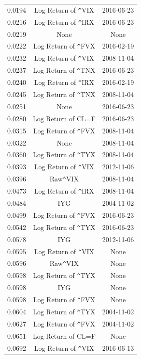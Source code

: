 \documentclass{uiucthesis2021}
\theoremstyle{definition}
\begin{document}
\begin{table}[ht]
\begin{tabular}{ccc}
      0.0194 & Log Return of \verb|^|VIX & 2016-06-23 \\ 
      0.0216 & Log Return of \verb|^|IRX & 2016-06-23 \\ 
      \rowcolor{yellow} 0.0219 & None & None \\ 
      0.0222 & Log Return of \verb|^|FVX & 2016-02-19 \\ 
      0.0232 & Log Return of \verb|^|VIX & 2008-11-04 \\ 
      0.0237 & Log Return of \verb|^|TNX & 2016-06-23 \\ 
      0.0240 & Log Return of \verb|^|IRX & 2016-02-19 \\ 
      0.0245 & Log Return of \verb|^|TNX & 2008-11-04 \\ 
      0.0251 & None & 2016-06-23 \\ 
      0.0280 & Log Return of CL=F & 2016-06-23 \\ 
      0.0315 & Log Return of \verb|^|FVX & 2008-11-04 \\ 
      0.0322 & None & 2008-11-04 \\ 
      0.0360 & Log Return of \verb|^|TYX & 2008-11-04 \\ 
      0.0393 & Log Return of \verb|^|VIX & 2012-11-06 \\ 
      0.0396 & Raw\verb|^|VIX & 2008-11-04 \\ 
      0.0473 & Log Return of \verb|^|IRX & 2008-11-04 \\ 
      0.0484 & IYG & 2004-11-02 \\ 
      0.0499 & Log Return of \verb|^|FVX & 2016-06-23 \\ 
      0.0542 & Log Return of \verb|^|TYX & 2016-06-23 \\ 
      0.0578 & IYG & 2012-11-06 \\ 
      0.0595 & Log Return of \verb|^|VIX & None \\ 
      0.0596 & Raw\verb|^|VIX & None \\ 
      0.0598 & Log Return of \verb|^|TYX & None \\ 
      0.0598 & IYG & None \\ 
      0.0598 & Log Return of \verb|^|FVX & None \\ 
      0.0604 & Log Return of \verb|^|TYX & 2004-11-02 \\ 
      0.0627 & Log Return of \verb|^|FVX & 2004-11-02 \\ 
      0.0651 & Log Return of CL=F & None \\ 
      0.0692 & Log Return of \verb|^|VIX & 2016-06-13 \\ 

\end{tabular}
\end{table}
\end{document}

